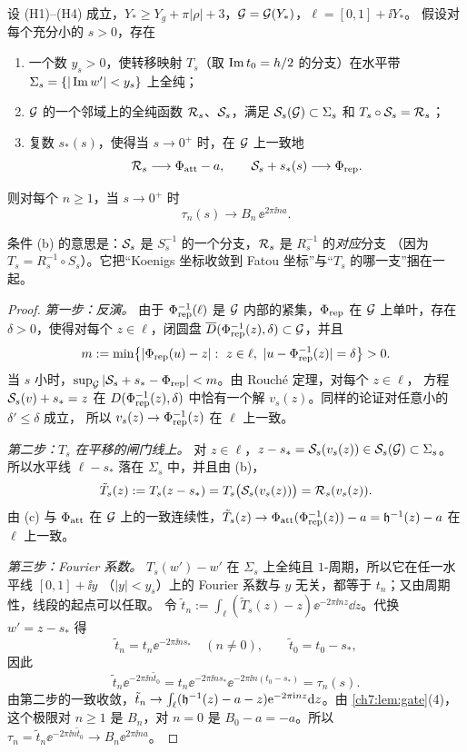 \begin{theorem}[化归到汇流]\label{thm:reduction}
设 (H1)--(H4) 成立，$Y_*\ge Y_g+\pi|\rho|+3$，$\mathcal G=\mathcal G(Y_*)$，$\ell=[0,1]+\ii Y_*$。
假设对每个充分小的 $s>0$，存在
\begin{enumerate}[label=\textup{(\alph*)}]
\item 一个数 $y_s>0$，使转移映射 $T_s$（取 $\operatorname{Im} t_0=h/2$ 的分支）在水平带
  $\Sigma_s=\{|\operatorname{Im} w'|<y_s\}$ 上全纯；
\item $\mathcal G$ 的一个邻域上的全纯函数 $\mathcal R_s$、$\mathcal S_s$，满足 $\mathcal S_s(\mathcal G)\subset\Sigma_s$ 和
  $T_s\circ\mathcal S_s=\mathcal R_s$；
\item 复数 $s_*(s)$，使得当 $s\to0^+$ 时，在 $\mathcal G$ 上一致地
  \[
   \mathcal R_s\longrightarrow\Phi_{\mathrm{att}}-a,\qquad \mathcal S_s+s_*(s)\longrightarrow\Phi_{\mathrm{rep}} .
  \]
\end{enumerate}
则对每个 $n\ge1$，当 $s\to0^+$ 时
\[
 \tau_n(s)\longrightarrow B_n\,\ee^{2\pi\ii na}.
\]
\end{theorem}

条件 (b) 的意思是：$\mathcal S_s$ 是 $S_s^{-1}$ 的一个分支，$\mathcal R_s$ 是 $R_s^{-1}$ 的\emph{对应}分支
（因为 $T_s=R_s^{-1}\circ S_s$）。它把``Koenigs 坐标收敛到 Fatou 坐标''与``$T_s$ 的哪一支''捆在一起。

\begin{proof}
\emph{第一步：反演。} 由于 $\Phi_{\mathrm{rep}}^{-1}(\ell)$ 是 $\mathcal G$ 内部的紧集，$\Phi_{\mathrm{rep}}$ 在 $\mathcal G$ 上单叶，存在 $\delta>0$，使得对每个
$z\in\ell$，闭圆盘 $\overline D(\Phi_{\mathrm{rep}}^{-1}(z),\delta)\subset\mathcal G$，并且
\[
 m:=\min\bigl\{|\Phirep(u)-z|:\ z\in\ell,\ |u-\Phirep^{-1}(z)|=\delta\bigr\}>0 .
\]
当 $s$ 小时，$\sup_{\mathcal G}|\mathcal S_s+s_*-\Phi_{\mathrm{rep}}|<m$。由 Rouché 定理，对每个 $z\in\ell$，
方程 $\mathcal S_s(v)+s_*=z$ 在 $D(\Phi_{\mathrm{rep}}^{-1}(z),\delta)$ 中恰有一个解 $v_s(z)$。同样的论证对任意小的 $\delta'\le\delta$ 成立，
所以 $v_s(z)\to\Phi_{\mathrm{rep}}^{-1}(z)$ 在 $\ell$ 上一致。

\emph{第二步：$T_s$ 在平移的闸门线上。} 对 $z\in\ell$，$z-s_*=\mathcal S_s(v_s(z))\in\mathcal S_s(\mathcal G)\subset\Sigma_s$。
所以水平线 $\ell-s_*$ 落在 $\Sigma_s$ 中，并且由 (b)，
\[
 \tilde T_s(z):=T_s(z-s_*)=T_s\bigl(\mathcal S_s(v_s(z))\bigr)=\mathcal R_s(v_s(z)).
\]
由 (c) 与 $\Phi_{\mathrm{att}}$ 在 $\mathcal G$ 上的一致连续性，$\tilde T_s(z)\to\Phi_{\mathrm{att}}(\Phi_{\mathrm{rep}}^{-1}(z))-a=\mathfrak h^{-1}(z)-a$ 在 $\ell$ 上一致。

\emph{第三步：Fourier 系数。} $T_s(w')-w'$ 在 $\Sigma_s$ 上全纯且 $1$-周期，所以它在任一水平线 $[0,1]+\ii y$
（$|y|<y_s$）上的 Fourier 系数与 $y$ 无关，都等于 $t_n$；又由周期性，线段的起点可以任取。
令 $\tilde t_n:=\int_\ell(\tilde T_s(z)-z)\ee^{-2\pi\ii nz}\dd z$。代换 $w'=z-s_*$ 得
\[
 \tilde t_n=t_n\ee^{-2\pi\ii ns_*}\quad(n\ne0),\qquad \tilde t_0=t_0-s_* ,
\]
因此
\[
 \tilde t_n\ee^{-2\pi\ii n\tilde t_0}=t_n\ee^{-2\pi\ii ns_*}\ee^{-2\pi\ii n(t_0-s_*)}=\tau_n(s).
\]
由第二步的一致收敛，$\tilde t_n\to\int_\ell(\mathfrak h^{-1}(z)-a-z)\mathrm{e}^{-2\pi\mathrm{i} nz}\mathrm{d} z$。由 \cref{ch7:lem:gate}(4)，
这个极限对 $n\ge1$ 是 $B_n$，对 $n=0$ 是 $B_0-a=-a$。所以
$\tau_n=\tilde t_n\ee^{-2\pi\ii n\tilde t_0}\to B_n\ee^{2\pi\ii na}$。
\end{proof}


